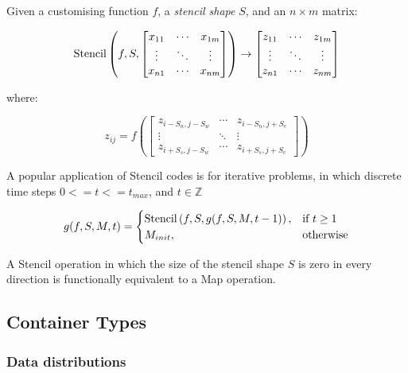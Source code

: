 Given a customising function $f$, a \emph{stencil shape} $S$, and an
$n \times m$ matrix:

\begin{equation}
\operatorname*{Stencil} \left( f, S,
\begin{bmatrix}
  x_{11} & \cdots & x_{1m} \\
  \vdots & \ddots & \vdots \\
  x_{n1} & \cdots & x_{nm}
\end{bmatrix} \right)
\to
\begin{bmatrix}
  z_{11} & \cdots & z_{1m} \\
  \vdots & \ddots & \vdots \\
  z_{n1} & \cdots & z_{nm}
\end{bmatrix}
\end{equation}

where:

\begin{equation}
z_{ij} = f \left(
\begin{bmatrix}
  z_{i-S_n,j-S_w} & \cdots & z_{i-S_n,j+S_e} \\
  \vdots & \ddots & \vdots \\
  z_{i+S_s,j-S_w} & \cdots & z_{i+S_s,j+S_e}
\end{bmatrix} \right)
\end{equation}

A popular application of Stencil codes is for iterative problems, in
which \todo{\ldots} discrete time steps $0 <= t <= t_{max}$, and
$t \in \mathbb{Z}$

\begin{equation}
g(f, S, M, t) =
\begin{cases}
  \operatorname*{Stencil} \left( f, S, g(f, S, M, t-1) \right),& \text{if } t \geq 1\\
  M_{init}, & \text{otherwise}
\end{cases}
\end{equation}

A Stencil operation in which the size of the stencil shape $S$ is zero
in every direction is functionally equivalent to a Map operation.


\subsection{Container Types}


\subsubsection{Data distributions}

